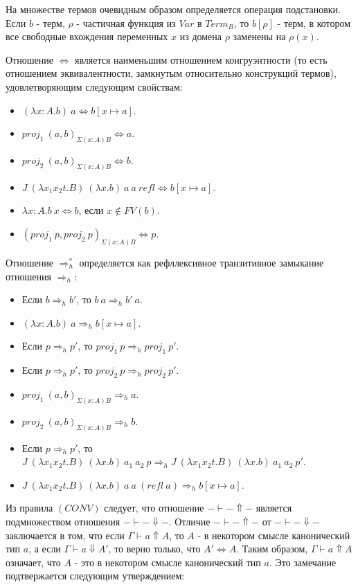 \documentclass{amsart}
\theoremstyle{definition}
\theoremstyle{remark}
\newcommand{\red}{\Rightarrow}
\newcommand{\deq}{\Leftrightarrow}
\numberwithin{figure}{section}
\begin{document}
На множестве термов очевидным образом определяется операция подстановки.
Если $b$ - терм, $\rho$ - частичная функция из $Var$ в $Term_B$, то $b[\rho]$ - терм, в котором все свободные вхождения переменных $x$ из домена $\rho$ заменены на $\rho(x)$.

Отношение $\deq$ является наименьшим отношением конгруэнтности (то есть отношением эквивалентности, замкнутым относительно конструкций термов), удовлетворяющим следующим свойствам:
\begin{itemize}
\item $(\lambda x : A. b)\ a \deq b[x \mapsto a]$.
\item $proj_1\ (a, b)_{\Sigma (x : A) B} \deq a$.
\item $proj_2\ (a, b)_{\Sigma (x : A) B} \deq b$.
\item $J\ (\lambda x_1 x_2 t. B)\ (\lambda x. b)\ a\ a\ refl \deq b[x \mapsto a]$.
\item $\lambda x : A. b\ x \deq b$, если $x \notin FV(b)$.
\item $(proj_1\ p, proj_2\ p)_{\Sigma (x : A) B} \deq p$.
\end{itemize}

Отношение $\red^*_h$ определяется как рефллексивное транзитивное замыкание отношения $\red_h$:
\begin{itemize}
\item Если $b \red_h b'$, то $b\ a \red_h b'\ a$.
\item $(\lambda x : A. b)\ a \red_h b[x \mapsto a]$.
\item Если $p \red_h p'$, то $proj_1\ p \red_h proj_1\ p'$.
\item Если $p \red_h p'$, то $proj_2\ p \red_h proj_2\ p'$.
\item $proj_1\ (a, b)_{\Sigma (x : A) B} \red_h a$.
\item $proj_2\ (a, b)_{\Sigma (x : A) B} \red_h b$.
\item Если $p \red_h p'$, то $J\ (\lambda x_1 x_2 t. B)\ (\lambda x. b)\ a_1\ a_2\ p \red_h J\ (\lambda x_1 x_2 t. B)\ (\lambda x. b)\ a_1\ a_2\ p'$.
\item $J\ (\lambda x_1 x_2 t. B)\ (\lambda x. b)\ a\ a\ (refl\ a) \red_h b[x \mapsto a]$.
\end{itemize}

Из правила $(CONV)$ следует, что отношение $- \vdash - \Uparrow -$ является подмножеством отношения $- \vdash - \Downarrow -$.
Отличие $- \vdash - \Uparrow -$ от $- \vdash - \Downarrow -$ заключается в том, что если $\Gamma \vdash a \Uparrow A$, то $A$ - в некотором смысле канонический тип $a$, а если $\Gamma \vdash a \Downarrow A'$, то верно только, что $A' \deq A$.
Таким образом, $\Gamma \vdash a \Uparrow A$ означает, что $A$ - это в некотором смысле канонический тип $a$.
Это замечание подтвержается следующим утверждением:
\end{document}
